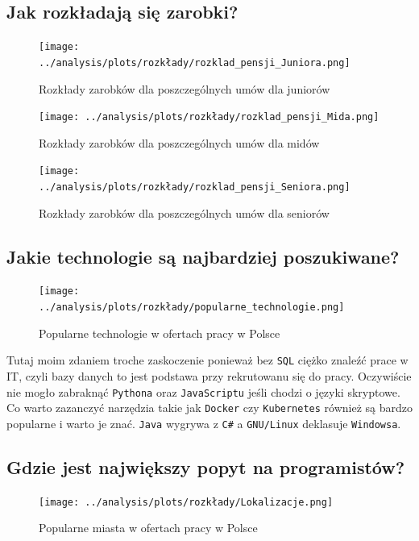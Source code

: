 \documentclass{article}
\begin{document}
\subsection{Jak rozkładają się zarobki?}

\begin{figure}[H]
    \centering
    \texttt{[image: ../analysis/plots/rozkłady/rozklad\_pensji\_Juniora.png]}
    \caption{Rozkłady zarobków dla poszczególnych umów dla juniorów}
\end{figure}

\begin{figure}[H]
    \centering
    \texttt{[image: ../analysis/plots/rozkłady/rozklad\_pensji\_Mida.png]}
    \caption{Rozkłady zarobków dla poszczególnych umów dla midów}
\end{figure}

\begin{figure}[H]
    \centering
    \texttt{[image: ../analysis/plots/rozkłady/rozklad\_pensji\_Seniora.png]}
    \caption{Rozkłady zarobków dla poszczególnych umów dla seniorów}
\end{figure}


\subsection{Jakie technologie są najbardziej poszukiwane?}

\begin{figure}[H]
    \centering
    \texttt{[image: ../analysis/plots/rozkłady/popularne\_technologie.png]}
    \caption{Popularne technologie w ofertach pracy w Polsce}
\end{figure}

\quad Tutaj moim zdaniem troche zaskoczenie ponieważ bez \texttt{SQL} ciężko znaleźć prace w IT, czyli
bazy danych to jest podstawa przy rekrutowanu się do pracy. Oczywiście nie mogło zabraknąć \texttt{Pythona} oraz \texttt{JavaScriptu} jeśli chodzi o języki skryptowe.
Co warto zazanczyć narzędzia takie jak \texttt{Docker} czy \texttt{Kubernetes} również są bardzo popularne i warto je znać. \texttt{Java} wygrywa z \texttt{C\#} a \texttt{GNU/Linux} deklasuje \texttt{Windowsa}.


\subsection{Gdzie jest największy popyt na programistów?}

\begin{figure}[H]
    \centering
    \texttt{[image: ../analysis/plots/rozkłady/Lokalizacje.png]}
    \caption{Popularne miasta w ofertach pracy w Polsce}
\end{figure}
\end{document}
